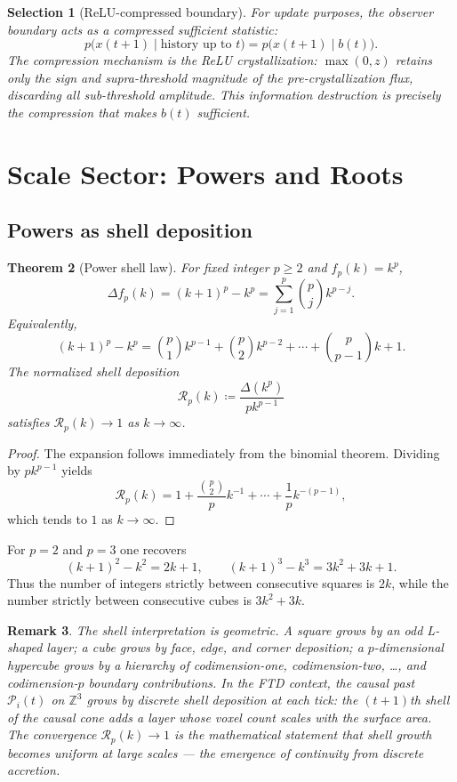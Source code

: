 \documentclass[11pt]{article}
\theoremstyle{tight}
\newtheorem{theorem}{Theorem}[section]
\theoremstyle{plainroman}
\newtheorem{selection}[theorem]{Selection}
\newtheorem{remark}[theorem]{Remark}
\newcommand{\Z}{\mathbb{Z}}
\newcommand{\causal}{\mathcal{P}}
\begin{document}
\begin{selection}[ReLU-compressed boundary]
For update purposes, the observer boundary acts as a compressed sufficient statistic:
\[
p\bigl(x(t{+}1)\mid \text{history up to }t\bigr)=p\bigl(x(t{+}1)\mid b(t)\bigr).
\]
The compression mechanism is the ReLU crystallization: $\max(0,z)$ retains only the sign and supra-threshold magnitude of the pre-crystallization flux, discarding all sub-threshold amplitude.
This information destruction is precisely the compression that makes $b(t)$ sufficient.
\end{selection}

\section{Scale Sector: Powers and Roots}

\subsection{Powers as shell deposition}

\begin{theorem}[Power shell law]
For fixed integer $p\ge 2$ and $f_p(k)=k^p$,
\[
\Delta f_p(k)=(k+1)^p-k^p
=\sum_{j=1}^{p}\binom{p}{j}k^{p-j}.
\]
Equivalently,
\[
(k+1)^p-k^p
=\binom{p}{1}k^{p-1}+\binom{p}{2}k^{p-2}+\cdots+\binom{p}{p-1}k+1.
\]
The normalized shell deposition
\[
\mathcal R_p(k)\coloneqq \frac{\Delta(k^p)}{pk^{p-1}}
\]
satisfies $\mathcal R_p(k)\to 1$ as $k\to\infty$.
\end{theorem}
\begin{proof}
The expansion follows immediately from the binomial theorem.
Dividing by $pk^{p-1}$ yields
\[
\mathcal R_p(k)=1+\frac{\binom{p}{2}}{p}k^{-1}+\cdots+\frac{1}{p}k^{-(p-1)},
\]
which tends to $1$ as $k\to\infty$.
\end{proof}
For $p=2$ and $p=3$ one recovers
\[
(k+1)^2-k^2=2k+1, \qquad (k+1)^3-k^3=3k^2+3k+1.
\]
Thus the number of integers strictly between consecutive squares is $2k$, while the number strictly between consecutive cubes is $3k^2+3k$.
\begin{remark}
The shell interpretation is geometric. A square grows by an odd L-shaped layer;
a cube grows by face, edge, and corner deposition; a $p$-dimensional hypercube grows by a hierarchy of codimension-one, codimension-two, \ldots, and codimension-$p$ boundary contributions.
In the FTD context, the causal past $\causal_i(t)$ on $\Z^3$ grows by discrete shell deposition at each tick: the $(t+1)$th shell of the causal cone adds a layer whose voxel count scales with the surface area.
The convergence $\mathcal R_p(k)\to 1$ is the mathematical statement that shell growth becomes uniform at large scales --- the emergence of continuity from discrete accretion.
\end{remark}
\end{document}

